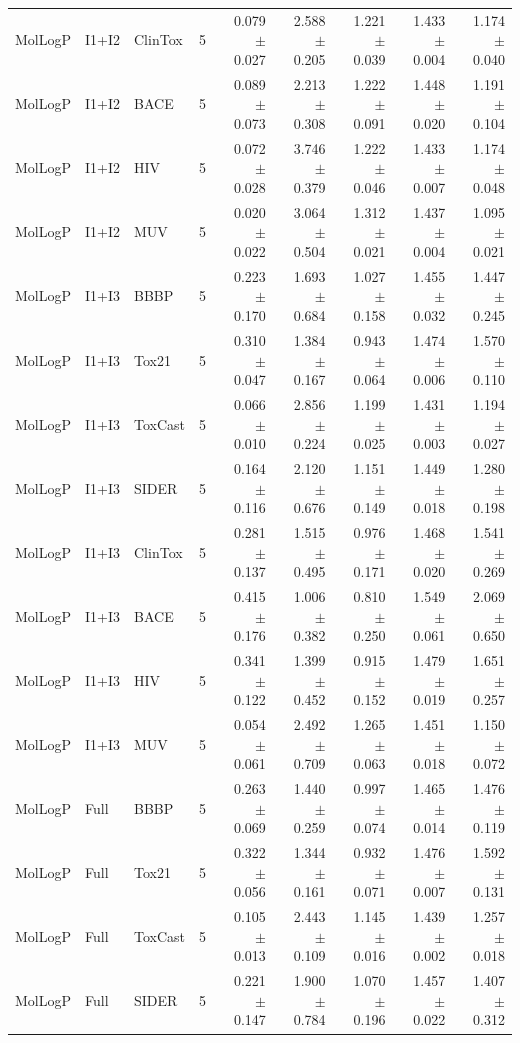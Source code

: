 \documentclass[journal=jcisd8,manuscript=article]{achemso}
\newcommand{\MolLogP}{MolLogP}
\begin{document}
\begin{landscape}
\begin{longtable}{lllrrrrrr}
\MolLogP & I1+I2 & ClinTox & 5 & 0.079 $\pm$ 0.027 & 2.588 $\pm$ 0.205 & 1.221 $\pm$ 0.039 & 1.433 $\pm$ 0.004 & 1.174 $\pm$ 0.040 \\
\MolLogP & I1+I2 & BACE & 5 & 0.089 $\pm$ 0.073 & 2.213 $\pm$ 0.308 & 1.222 $\pm$ 0.091 & 1.448 $\pm$ 0.020 & 1.191 $\pm$ 0.104 \\
\MolLogP & I1+I2 & HIV & 5 & 0.072 $\pm$ 0.028 & 3.746 $\pm$ 0.379 & 1.222 $\pm$ 0.046 & 1.433 $\pm$ 0.007 & 1.174 $\pm$ 0.048 \\
\MolLogP & I1+I2 & MUV & 5 & 0.020 $\pm$ 0.022 & 3.064 $\pm$ 0.504 & 1.312 $\pm$ 0.021 & 1.437 $\pm$ 0.004 & 1.095 $\pm$ 0.021 \\
\MolLogP & I1+I3 & BBBP & 5 & 0.223 $\pm$ 0.170 & 1.693 $\pm$ 0.684 & 1.027 $\pm$ 0.158 & 1.455 $\pm$ 0.032 & 1.447 $\pm$ 0.245 \\
\MolLogP & I1+I3 & Tox21 & 5 & 0.310 $\pm$ 0.047 & 1.384 $\pm$ 0.167 & 0.943 $\pm$ 0.064 & 1.474 $\pm$ 0.006 & 1.570 $\pm$ 0.110 \\
\MolLogP & I1+I3 & ToxCast & 5 & 0.066 $\pm$ 0.010 & 2.856 $\pm$ 0.224 & 1.199 $\pm$ 0.025 & 1.431 $\pm$ 0.003 & 1.194 $\pm$ 0.027 \\
\MolLogP & I1+I3 & SIDER & 5 & 0.164 $\pm$ 0.116 & 2.120 $\pm$ 0.676 & 1.151 $\pm$ 0.149 & 1.449 $\pm$ 0.018 & 1.280 $\pm$ 0.198 \\
\MolLogP & I1+I3 & ClinTox & 5 & 0.281 $\pm$ 0.137 & 1.515 $\pm$ 0.495 & 0.976 $\pm$ 0.171 & 1.468 $\pm$ 0.020 & 1.541 $\pm$ 0.269 \\
\MolLogP & I1+I3 & BACE & 5 & 0.415 $\pm$ 0.176 & 1.006 $\pm$ 0.382 & 0.810 $\pm$ 0.250 & 1.549 $\pm$ 0.061 & 2.069 $\pm$ 0.650 \\
\MolLogP & I1+I3 & HIV & 5 & 0.341 $\pm$ 0.122 & 1.399 $\pm$ 0.452 & 0.915 $\pm$ 0.152 & 1.479 $\pm$ 0.019 & 1.651 $\pm$ 0.257 \\
\MolLogP & I1+I3 & MUV & 5 & 0.054 $\pm$ 0.061 & 2.492 $\pm$ 0.709 & 1.265 $\pm$ 0.063 & 1.451 $\pm$ 0.018 & 1.150 $\pm$ 0.072 \\
\MolLogP & Full & BBBP & 5 & 0.263 $\pm$ 0.069 & 1.440 $\pm$ 0.259 & 0.997 $\pm$ 0.074 & 1.465 $\pm$ 0.014 & 1.476 $\pm$ 0.119 \\
\MolLogP & Full & Tox21 & 5 & 0.322 $\pm$ 0.056 & 1.344 $\pm$ 0.161 & 0.932 $\pm$ 0.071 & 1.476 $\pm$ 0.007 & 1.592 $\pm$ 0.131 \\
\MolLogP & Full & ToxCast & 5 & 0.105 $\pm$ 0.013 & 2.443 $\pm$ 0.109 & 1.145 $\pm$ 0.016 & 1.439 $\pm$ 0.002 & 1.257 $\pm$ 0.018 \\
\MolLogP & Full & SIDER & 5 & 0.221 $\pm$ 0.147 & 1.900 $\pm$ 0.784 & 1.070 $\pm$ 0.196 & 1.457 $\pm$ 0.022 & 1.407 $\pm$ 0.312 \\

\end{longtable}
\end{landscape}
\end{document}
